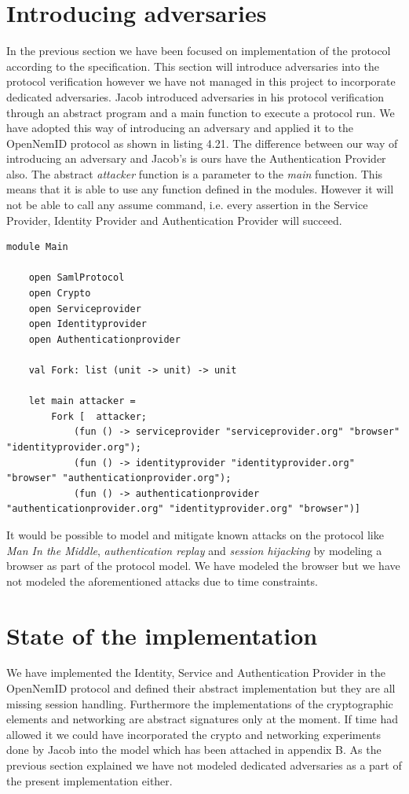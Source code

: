 \documentclass[twosided]{report}
\begin{document}
\section{Introducing adversaries}
In the previous section we have been focused on implementation of the protocol according to the specification. This section will introduce adversaries into the protocol verification however we have not managed in this project to incorporate dedicated adversaries. Jacob introduced adversaries in his protocol verification through an abstract program and a main function to execute a protocol run. We have adopted this way of introducing an adversary and applied it to the OpenNemID protocol as shown in listing 4.21. The difference between our way of introducing an adversary and Jacob's is ours have the Authentication Provider also. The abstract \emph{attacker} function is a parameter to the \emph{main} function. This means that it is able to use any function defined in the modules. However it will not be able to call any assume command, i.e. every assertion in the Service Provider, Identity Provider and Authentication Provider will succeed.
\begin{lstlisting}[style=fstar, caption={Main module for introducing adversaries}]
	module Main

	open SamlProtocol
	open Crypto
	open Serviceprovider
	open Identityprovider
	open Authenticationprovider

	val Fork: list (unit -> unit) -> unit	

	let main attacker =	
		Fork [	attacker;
			(fun () -> serviceprovider "serviceprovider.org" "browser" "identityprovider.org");
			(fun () -> identityprovider "identityprovider.org" "browser" "authenticationprovider.org");
			(fun () -> authenticationprovider "authenticationprovider.org" "identityprovider.org" "browser")]
\end{lstlisting}
It would be possible to model and mitigate known attacks on the protocol like \emph{Man In the Middle}, \emph{authentication replay} and \emph{session hijacking} by modeling a browser as part of the protocol model. We have modeled the browser but we have not modeled the aforementioned attacks due to time constraints.

\section{State of the implementation}
We have implemented the Identity, Service and Authentication Provider in the OpenNemID protocol and defined their abstract implementation but they are all missing session handling. Furthermore the implementations of the cryptographic elements and networking are abstract signatures only at the moment. If time had allowed it we could have incorporated the crypto and networking experiments done by Jacob into the model which has been attached in appendix B. As the previous section explained we have not modeled dedicated adversaries as a part of the present implementation either.
\end{document}
